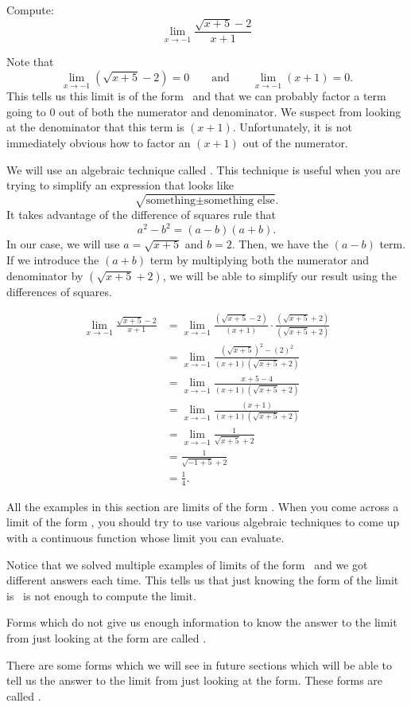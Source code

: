 \documentclass{ximera}
\begin{document}
\begin{example}
  Compute:
  \[
  \lim_{x\to-1} \frac{\sqrt{x+5}-2}{x+1}
  \]

\begin{explanation} 
  Note that 
  \[
  \lim_{x\to-1} \left(\sqrt{x+5}-2\right)=0\qquad\text{and}\qquad\lim_{x\to -1} \left(x+1\right) =0.
  \]
  This tells us this limit is of the form \zeroOverZero\ and that we
  can probably factor a term going to $0$ out of both the numerator
  and denominator.  We suspect from looking at the denominator that
  this term is $(x+1)$.  Unfortunately, it is not immediately obvious
  how to factor an $(x+1)$ out of the numerator.
 
  We will use an algebraic technique called .  This technique is useful when you are trying to
  simplify an expression that looks like
  \[
  \sqrt{\text{something} \pm \text{something else}}.
  \]
  It takes advantage of the difference of squares rule that
  \[
  a^2-b^2=(a-b)(a+b).
  \]
  In our case, we will use $a=\sqrt{x+5}$ and $b=2$.  Then, we have
  the $(a-b)$ term.  If we introduce the $(a+b)$ term by multiplying
  both the numerator and denominator by $(\sqrt{x+5}+2)$, we will be
  able to simplify our result using the differences of squares.
 
\begin{align*}
\lim_{x\to-1} \frac{\sqrt{x+5}-2}{x+1}&=
\lim_{x\to-1} \frac{(\sqrt{x+5}-2)}{(x+1)} \cdot \frac{(\sqrt{x+5}+2)}{(\sqrt{x+5}+2)} \\
&=\lim_{x\to-1} \frac{(\sqrt{x+5})^2-(2)^2}{(x+1)(\sqrt{x+5}+2)} \\
&=\lim_{x\to-1} \frac{x+5-4}{(x+1)(\sqrt{x+5}+2)} \\
&=\lim_{x\to-1} \frac{(x+1)}{(x+1)(\sqrt{x+5}+2)} \\
&=\lim_{x\to-1} \frac{1}{\sqrt{x+5}+2}\\
&= \frac{1}{\sqrt{-1+5}+2}\\
&=\frac{1}{4}.
\end{align*}
\end{explanation}
\end{example}

All the examples in this section are limits of the form \zeroOverZero.
When you come across a limit of the form \zeroOverZero, you should try
to use various algebraic techniques to come up with a continuous
function whose limit you can evaluate.

Notice that we solved multiple examples of limits of the form
\zeroOverZero\ and we got different answers each time.  This tells us
that just knowing the form of the limit is \zeroOverZero\ is not enough
to compute the limit.

\begin{definition}
Forms which do not give us enough information to know the answer to
the limit from just looking at the form are called .

There are some forms which we will see in future sections which will
be able to tell us the answer to the limit from just looking at the
form. These forms are called .
\end{definition}  
\end{document}
